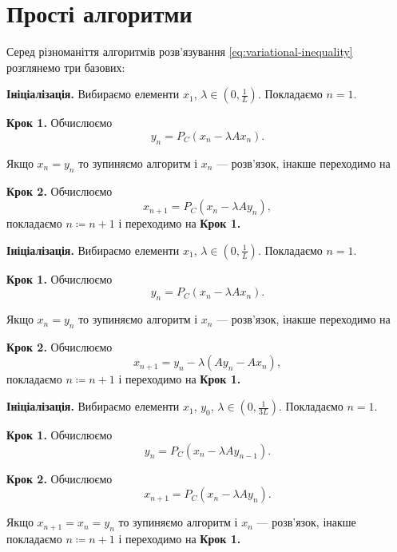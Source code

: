 \chapter{Прості алгоритми}

Серед різноманіття алгоритмів розв'язування \eqref{eq:variational-inequality} розглянемо три базових:

\begin{algorithm}[Корпелевич]
    \label{algo:korpelevich}
    \textbf{Ініціалізація.} Вибираємо елементи $x_1$, $\lambda \in \left( 0, \frac{1}{L} \right)$. Покладаємо $n = 1$. \medskip

    \textbf{Крок 1.} Обчислюємо
    \begin{equation}
        y_n = P_C (x_n - \lambda A x_n).
    \end{equation}
    
    Якщо $x_n = y_n$ то зупиняємо алгоритм і $x_n$ --- розв'язок, інакше переходимо на \medskip
    
    \textbf{Крок 2.} Обчислюємо
    \begin{equation}
        x_{n + 1} = P_C (x_n - \lambda A y_n),
    \end{equation}
    покладаємо $n \coloneqq n + 1$ і переходимо на \textbf{Крок 1.}
\end{algorithm}

\begin{algorithm}[P. Tseng]
    \label{algo:tseng}
    \textbf{Ініціалізація.} Вибираємо елементи $x_1$, $\lambda \in \left( 0, \frac{1}{L} \right)$. Покладаємо $n = 1$. \medskip

    \textbf{Крок 1.} Обчислюємо
    \begin{equation}
        y_n = P_C (x_n - \lambda A x_n).
    \end{equation}
    
    Якщо $x_n = y_n$ то зупиняємо алгоритм і $x_n$ --- розв'язок, інакше переходимо на \medskip
    
    \textbf{Крок 2.} Обчислюємо
    \begin{equation}
        x_{n + 1} = y_n - \lambda (A y_n - A x_n),
    \end{equation}
    покладаємо $n \coloneqq n + 1$ і переходимо на \textbf{Крок 1.}
\end{algorithm}

\begin{algorithm}[Попов]
    \label{algo:popov}
    \textbf{Ініціалізація.} Вибираємо елементи $x_1$, $y_0$, $\lambda \in \left( 0, \frac{1}{3L} \right)$. Покладаємо $n = 1$. \medskip

    \textbf{Крок 1.} Обчислюємо
    \begin{equation}
        y_n = P_C (x_n - \lambda A y_{n - 1}).
    \end{equation}
    
    \textbf{Крок 2.} Обчислюємо
    \begin{equation}
        x_{n + 1} = P_C (x_n - \lambda A y_n).
    \end{equation}
    
    Якщо $x_{n + 1} = x_n = y_n$ то зупиняємо алгоритм і $x_n$ --- розв'язок, інакше покладаємо $n \coloneqq n + 1$ і переходимо на \textbf{Крок 1.}
\end{algorithm}

